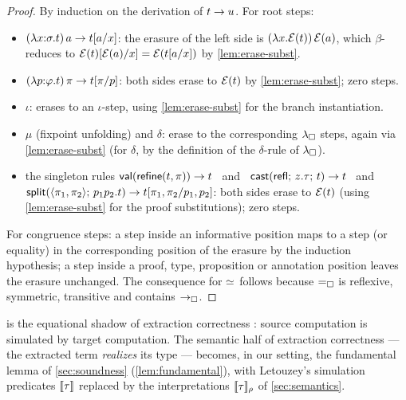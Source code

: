 \begin{proof}
By induction on the derivation of $t \rightarrow u$.  For root steps:
\begin{itemize}[leftmargin=2em]
\item $(\lambda x{:}\sigma.t)\,a \rightarrow t[a/x]$: the erasure of the
  left side is $(\lambda x.\mathcal{E}(t))\,\mathcal{E}(a)$, which $\beta$-reduces to
  $\mathcal{E}(t)[\mathcal{E}(a)/x] = \mathcal{E}(t[a/x])$ by
  \cref{lem:erase-subst}.
\item $(\lambda p{:}\varphi.t)\,\pi \rightarrow t[\pi/p]$: both sides
  erase to $\mathcal{E}(t)$ by \cref{lem:erase-subst}; zero steps.
\item $\iota$: erases to an $\iota$-step, using \cref{lem:erase-subst} for
  the branch instantiation.
\item $\mu$ (fixpoint unfolding) and $\delta$: erase to the corresponding
  $\lambda_{\square}$ steps, again via \cref{lem:erase-subst} (for $\delta$, by the
  definition of the $\delta$-rule of $\lambda_{\square}$).
\item the singleton rules
  $\mathsf{val}(\mathsf{refine}(t,\pi)) \rightarrow t$ \ and \
  $\mathsf{cast}(\mathsf{refl};\,z.\tau;\,t) \rightarrow t$ \ and \
  $\mathsf{split}(\langle\pi_1,\pi_2\rangle;\,p_1p_2.t) \rightarrow
  t[\pi_1,\pi_2/p_1,p_2]$: both sides erase to
  $\mathcal{E}(t)$ (using \cref{lem:erase-subst} for the proof substitutions);
  zero steps.
\end{itemize}
For congruence steps: a step inside an informative position maps to a step
(or equality) in the corresponding position of the erasure by the
induction hypothesis; a step inside a proof, type, proposition or
annotation position leaves the erasure unchanged.  The consequence for
$\simeq$ follows because $=_{\square}$ is reflexive, symmetric, transitive and
contains $\rightarrow_{\square}$.
\end{proof}

\begin{remark}
 is the equational shadow of extraction correctness
\cite[\S 2.3]{Letouzey2004}: source computation is simulated by target
computation.  The semantic half of extraction correctness --- the
extracted term \emph{realizes} its type --- becomes, in our setting, the
fundamental lemma of \cref{sec:soundness} (\cref{lem:fundamental}), with
Letouzey's simulation predicates $[\![ \tau ]\!]$ replaced by the
interpretations $[\![ \tau ]\!]_{\rho}$ of \cref{sec:semantics}.
\end{remark}
